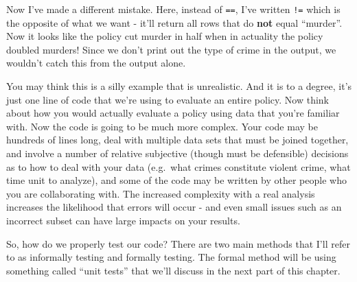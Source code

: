 \documentclass[
]{krantz}
\makeatletter
\newenvironment{Shaded}{\begin{snugshade}}{\end{snugshade}}
\newcommand{\CommentTok}[1]{\textcolor[rgb]{0.37,0.37,0.37}{\textit{#1}}}
\newcommand{\FunctionTok}[1]{\textcolor[rgb]{0,0,0}{#1}}
\newcommand{\NormalTok}[1]{#1}
\newcommand{\SpecialCharTok}[1]{\textcolor[rgb]{0,0,0}{#1}}
\newcommand{\StringTok}[1]{\textcolor[rgb]{0.5,0.5,0.5}{#1}}
\newenvironment{kframe}{%
\medskip{}
\setlength{\fboxsep}{.8em}
 \def\at@end@of@kframe{}%
 \ifinner\ifhmode%
  \def\at@end@of@kframe{\end{minipage}}%
  \begin{minipage}{\columnwidth}%
 \fi\fi%
 \def\FrameCommand##1{\hskip\@totalleftmargin \hskip-\fboxsep
 \colorbox{shadecolor}{##1}\hskip-\fboxsep
     \hskip-\linewidth \hskip-\@totalleftmargin \hskip\columnwidth}%
 \MakeFramed {\advance\hsize-\width
   \@totalleftmargin\z@ \linewidth\hsize
   \@setminipage}}%
 {\par\unskip\endMakeFramed%
 \at@end@of@kframe}
\renewenvironment{Shaded}{\begin{kframe}}{\end{kframe}}
\makeatother
\begin{document}
Now I've made a different mistake. Here, instead of \texttt{==}, I've written \texttt{!=} which is the opposite of what we want - it'll return all rows that do \textbf{not} equal ``murder''. Now it looks like the policy cut murder in half when in actuality the policy doubled murders! Since we don't print out the type of crime in the output, we wouldn't catch this from the output alone.

\begin{Shaded}
\end{Shaded}

You may think this is a silly example that is unrealistic. And it is to a degree, it's just one line of code that we're using to evaluate an entire policy. Now think about how you would actually evaluate a policy using data that you're familiar with. Now the code is going to be much more complex. Your code may be hundreds of lines long, deal with multiple data sets that must be joined together, and involve a number of relative subjective (though must be defensible) decisions as to how to deal with your data (e.g.~what crimes constitute violent crime, what time unit to analyze), and some of the code may be written by other people who you are collaborating with. The increased complexity with a real analysis increases the likelihood that errors will occur - and even small issues such as an incorrect subset can have large impacts on your results.

So, how do we properly test our code? There are two main methods that I'll refer to as informally testing and formally testing. The formal method will be using something called ``unit tests'' that we'll discuss in the next part of this chapter.
\end{document}
